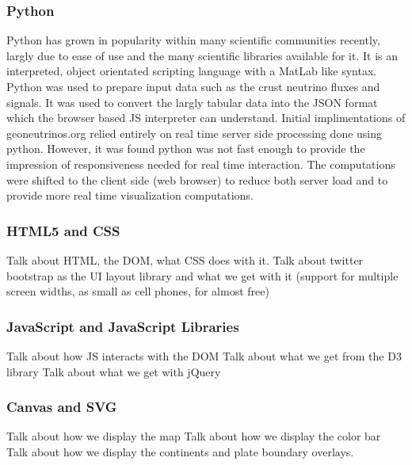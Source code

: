 \documentclass[12pt,a4paper]{article}
\begin{document}
\subsubsection{Python}
Python has grown in popularity within many scientific communities recently, largly due to ease of use and the many scientific libraries available for it.
It is an interpreted, object orientated scripting language with a MatLab like syntax.
Python was used to prepare input data such as the crust neutrino fluxes and signals.
It was used to convert the largly tabular data into the JSON format which the browser based JS interpreter can understand.
Initial implimentations of geoneutrinos.org relied entirely on real time server side processing done using python.
However, it was found python was not fast enough to provide the impression of responsiveness needed for real time interaction.
The computations were shifted to the client side (web browser) to reduce both server load and to provide more real time visualization computations.

\subsubsection{HTML5 and CSS}
Talk about HTML, the DOM, what CSS does with it.
Talk about twitter bootstrap as the UI layout library and what we get with it (support for multiple screen widths, as small as cell phones, for almost free)

\subsubsection{JavaScript and JavaScript Libraries}
Talk about how JS interacts with the DOM
Talk about what we get from the D3 library
Talk about what we get with jQuery

\subsubsection{Canvas and SVG}
Talk about how we display the map
Talk about how we display the color bar
Talk about how we display the continents and plate boundary overlays.
\end{document}
